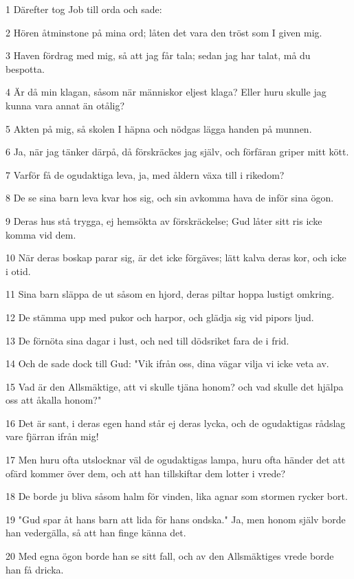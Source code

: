 \par 1 Därefter tog Job till orda och sade:
\par 2 Hören åtminstone på mina ord; låten det vara den tröst som I given mig.
\par 3 Haven fördrag med mig, så att jag får tala; sedan jag har talat, må du bespotta.
\par 4 Är då min klagan, såsom när människor eljest klaga? Eller huru skulle jag kunna vara annat än otålig?
\par 5 Akten på mig, så skolen I häpna och nödgas lägga handen på munnen.
\par 6 Ja, när jag tänker därpå, då förskräckes jag själv, och förfäran griper mitt kött.
\par 7 Varför få de ogudaktiga leva, ja, med åldern växa till i rikedom?
\par 8 De se sina barn leva kvar hos sig, och sin avkomma hava de inför sina ögon.
\par 9 Deras hus stå trygga, ej hemsökta av förskräckelse; Gud låter sitt ris icke komma vid dem.
\par 10 När deras boskap parar sig, är det icke förgäves; lätt kalva deras kor, och icke i otid.
\par 11 Sina barn släppa de ut såsom en hjord, deras piltar hoppa lustigt omkring.
\par 12 De stämma upp med pukor och harpor, och glädja sig vid pipors ljud.
\par 13 De förnöta sina dagar i lust, och ned till dödsriket fara de i frid.
\par 14 Och de sade dock till Gud: "Vik ifrån oss, dina vägar vilja vi icke veta av.
\par 15 Vad är den Allsmäktige, att vi skulle tjäna honom? och vad skulle det hjälpa oss att åkalla honom?"
\par 16 Det är sant, i deras egen hand står ej deras lycka, och de ogudaktigas rådslag vare fjärran ifrån mig!
\par 17 Men huru ofta utslocknar väl de ogudaktigas lampa, huru ofta händer det att ofärd kommer över dem, och att han tillskiftar dem lotter i vrede?
\par 18 De borde ju bliva såsom halm för vinden, lika agnar som stormen rycker bort.
\par 19 "Gud spar åt hans barn att lida för hans ondska." Ja, men honom själv borde han vedergälla, så att han finge känna det.
\par 20 Med egna ögon borde han se sitt fall, och av den Allsmäktiges vrede borde han få dricka.
